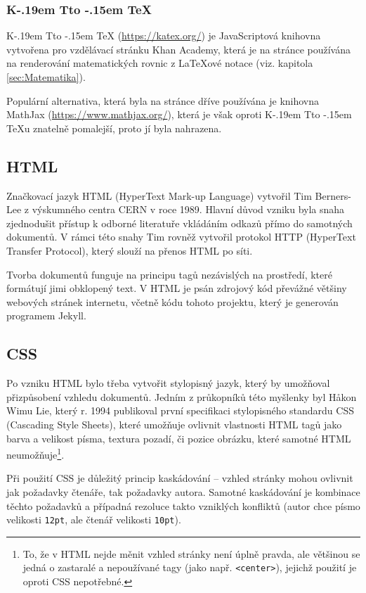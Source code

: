 \documentclass[a4paper, 12pt]{article}
\makeatletter
\DeclareRobustCommand{\KaTeX}{%
  K\kern -.19em
  {\sbox \z@ T\vbox to\ht \z@ {\hbox{%
  \check@mathfonts
  \fontsize\sf@size\z@
  \selectfont A}%
  \vss}%
}\kern -.15em
\TeX}
\makeatother
\begin{document}
  \subsubsection{\texorpdfstring{\KaTeX}{KaTeX}} \label{sec:KaTeX}
  \KaTeX{} (\url{https://katex.org/}) je JavaScriptová knihovna vytvořena pro vzdělávací stránku Khan Academy, která je na stránce používána na renderování matematických rovnic z \LaTeX ové notace (viz. kapitola \ref{sec:Matematika}).

  Populární alternativa, která byla na stránce dříve používána je knihovna MathJax (\url{https://www.mathjax.org/}), která je však oproti \KaTeX u znatelně pomalejší, proto jí byla nahrazena\cite{katex-mathjax-comparison}.


  \subsection{HTML} \label{sec:HTML}
  Značkovací jazyk HTML (HyperText Mark-up Language) vytvořil Tim Berners-Lee z výskumného centra CERN v roce 1989. Hlavní důvod vzniku byla snaha zjednodušit přístup k odborné literatuře vkládáním odkazů přímo do samotných dokumentů. V rámci této snahy Tim rovněž vytvořil protokol HTTP (HyperText Transfer Protocol), který slouží na přenos HTML po síti\cite{html-history}.

  Tvorba dokumentů funguje na principu tagů nezávislých na prostředí, které formátují jimi obklopený text. V HTML je psán zdrojový kód převážné většiny webových stránek internetu, včetně kódu tohoto projektu, který je generován programem Jekyll.


  \subsection{CSS} \label{sec:CSS}
  Po vzniku HTML bylo třeba vytvořit stylopisný jazyk, který by umožňoval přizpůsobení vzhledu dokumentů. Jedním z průkopníků této myšlenky byl Håkon Wimu Lie, který r. 1994 publikoval první specifikaci stylopisného standardu CSS (Cascading Style Sheets)\cite{css-proposal, css-saga}, které umožňuje ovlivnit vlastnosti HTML tagů jako barva a velikost písma, textura pozadí, či pozice obrázku, které samotné HTML neumožňuje\footnote{To, že v HTML nejde měnit vzhled stránky není úplně pravda, ale většinou se jedná o zastaralé a nepoužívané tagy (jako např. \texttt{<center>}), jejichž použití je oproti CSS nepotřebné.}.

  Při použití CSS je důležitý princip kaskádování -- vzhled stránky mohou ovlivnit jak požadavky čtenáře, tak požadavky autora. Samotné kaskádování je kombinace těchto požadavků a případná rezoluce takto vzniklých konfliktů (autor chce písmo velikosti \texttt{12pt}, ale čtenář velikosti \texttt{10pt}).
\end{document}
